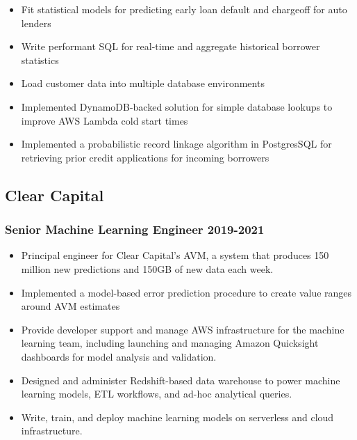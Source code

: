 \documentclass[11pt,a4paper,]{awesome-cv}
\providecommand{\tightlist}{%
	\setlength{\itemsep}{0pt}\setlength{\parskip}{0pt}}
\begin{document}
\begin{itemize}
\tightlist
\item
  Fit statistical models for predicting early loan default and chargeoff
  for auto lenders
\item
  Write performant SQL for real-time and aggregate historical borrower
  statistics
\item
  Load customer data into multiple database environments
\item
  Implemented DynamoDB-backed solution for simple database lookups to
  improve AWS Lambda cold start times
\item
  Implemented a probabilistic record linkage algorithm in PostgresSQL
  for retrieving prior credit applications for incoming borrowers
\end{itemize}

\hypertarget{clear-capital}{%
\subsection{Clear Capital}\label{clear-capital}}

\hypertarget{senior-machine-learning-engineer--2021}{%
\subsubsection{\texorpdfstring{Senior Machine Learning Engineer
\hfill 2019-2021}{Senior Machine Learning Engineer -2021}}\label{senior-machine-learning-engineer--2021}}

\begin{itemize}
\tightlist
\item
  Principal engineer for Clear Capital's AVM, a system that produces 150
  million new predictions and 150GB of new data each week.
\item
  Implemented a model-based error prediction procedure to create value
  ranges around AVM estimates
\item
  Provide developer support and manage AWS infrastructure for the
  machine learning team, including launching and managing Amazon
  Quicksight dashboards for model analysis and validation.
\item
  Designed and administer Redshift-based data warehouse to power machine
  learning models, ETL workflows, and ad-hoc analytical queries.
\item
  Write, train, and deploy machine learning models on serverless and
  cloud infrastructure.
\end{itemize}
\end{document}
